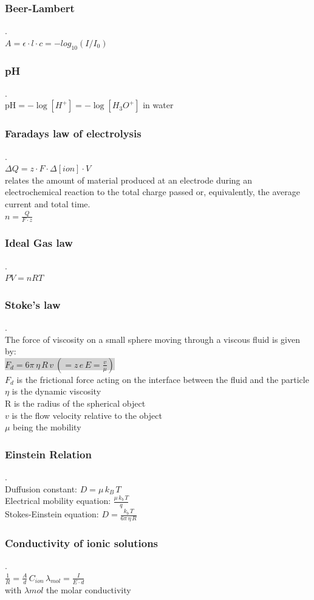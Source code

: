 \documentclass[9pt]{article}
\newcommand{\grey}[1]{\setlength{\fboxsep}{0pt}\colorbox{lightgrey}{#1}}
\begin{document}
\begin{multicols}{2}
\subsubsection{Beer-Lambert}.\\
$A=\epsilon\cdot l\cdot c=-log_{10}(I/I_0)$\\
\subsubsection{pH}.\\
pH$= -\log [H^+] =-\log [H_3 O^+] $ in water\\
\subsubsection{Faradays law of electrolysis} \label{Faradays law of electrolysis}.\\
$\Delta Q= z\cdot F\cdot \Delta [ion]\cdot V$\\
relates the amount of material produced at an electrode during an electrochemical reaction to the total charge passed or, equivalently, the average current and total time.\\
$n=\frac{Q}{F\cdot z}$
\subsubsection{Ideal Gas law}.\\
$PV=nRT$\\
\subsubsection{Stoke's law}.\\
The force of viscosity on a small sphere moving through a viscous fluid is given by:\\
 \grey{$F_{d}=6\pi \,\eta \,R\,v\  (= z\, e\, E=\frac{v}{\mu})$}\\
$F_d$ is the frictional force acting on the interface between the fluid and the particle\\
$\eta $ is the dynamic viscosity \\
R is the radius of the spherical object\\
$v$ is the flow velocity relative to the object\\
$\mu$ being the mobility\\
\subsubsection{Einstein Relation}.\\
Duffusion constant: $D= \mu \,  k_B\, T$\\
Electrical mobility equation: $\frac{\mu \, k_b\, T }{q}$\\
Stokes-Einstein equation: $D=\frac{k_b\, T}{6\pi \,\eta \,R}$\\
\subsubsection{Conductivity of ionic solutions}.\\
$\frac{1}{R}=\frac{A}{d}\, C_{ion}\, \lambda _{mol}=\frac{I}{E\cdot d}$\\
with $\lambda {mol}$ the molar conductivity
\end{multicols}
\end{document}
